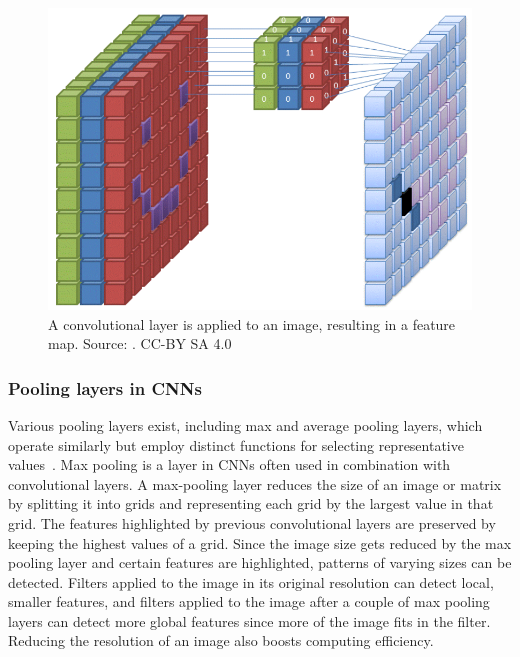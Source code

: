 \begin{figure}[H]
  \centering
  \includegraphics[width=\columnwidth]{figure/convlayer.png}
  \caption{A convolutional layer is applied to an image, resulting in a feature map. Source: \cite{cnnbild}. CC-BY SA 4.0}
  \label{fig:conv}
\end{figure}

\subsubsection{Pooling layers in CNNs}
Various pooling layers exist, including max and average pooling layers, which operate similarly but employ distinct functions for selecting representative values~\cite{cnnforklarning}. Max pooling is a layer in CNNs often used in combination with convolutional layers. A max-pooling layer reduces the size of an image or matrix by splitting it into grids and representing each grid by the largest value in that grid. The features highlighted by previous convolutional layers are preserved by keeping the highest values of a grid. Since the image size gets reduced by the max pooling layer and certain features are highlighted, patterns of varying sizes can be detected. Filters applied to the image in its original resolution can detect local, smaller features, and filters applied to the image after a couple of max pooling layers can detect more global features since more of the image fits in the filter. Reducing the resolution of an image also boosts computing efficiency.

